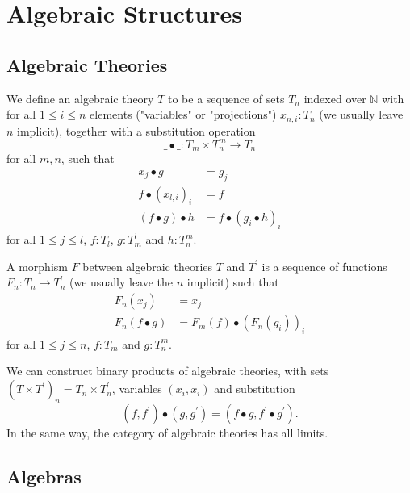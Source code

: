 \chapter{Algebraic Structures}

\section{Algebraic Theories}\label{sec:algebraic-theories}

\begin{definition}
  We define an algebraic theory $ T $ to be a sequence of sets $ T_n $ indexed over $ \mathbb N $ with for all $ 1 \leq i \leq n $ elements ("variables" or "projections") $ x_{n, i}: T_n $ (we usually leave $ n $ implicit), together with a substitution operation
  \[ \_ \bullet \_: T_m \times T_n^m \to T_n \]
  for all $ m, n $, such that
  \begin{align*}
    x_j \bullet g &= g_j\\
    f \bullet (x_{l, i})_i &= f\\
    (f \bullet g) \bullet h &= f \bullet (g_i \bullet h)_i
  \end{align*}
  for all $ 1 \leq j \leq l $, $ f: T_l $, $ g: T_m^l $ and $ h: T_n^m $.
\end{definition}

\begin{definition}
  A morphism $ F $ between algebraic theories $ T $ and $ T^\prime $ is a sequence of functions $ F_n: T_n \to T^\prime_n $ (we usually leave the $ n $ implicit) such that
  \begin{align*}
    F_n(x_j) &= x_j\\
    F_n(f \bullet g) &= F_m(f) \bullet (F_n(g_i))_i
  \end{align*}
  for all $ 1 \leq j \leq n $, $ f: T_m $ and $ g: T_n^m $.
\end{definition}

\begin{remark}
  We can construct binary products of algebraic theories, with sets $ (T \times T^\prime)_n = T_n \times T^\prime_n $, variables $ (x_i, x_i) $ and substitution
  \[ (f, f^\prime) \bullet (g, g^\prime) = (f \bullet g, f^\prime \bullet g^\prime). \]
  In the same way, the category of algebraic theories has all limits.
\end{remark}

\section{Algebras}

